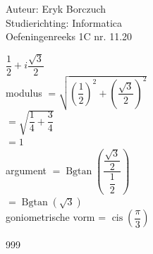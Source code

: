 \documentclass[a4paper]{article}
\begin{document}
  
\noindent \large Auteur: Eryk Borczuch \\
\noindent \large Studierichting: Informatica\\
\noindent \large Oefeningenreeks 1C nr. 11.20\\

\medskip

\normalsize

$\dfrac{1}{2} + i \dfrac{\sqrt{3}}{2}$\\

modulus $= \sqrt{\left(\dfrac{1}{2}\right)^2 + \left(\dfrac{\sqrt{3}}{2}\right)^2}$\\

$= \sqrt{\dfrac{1}{4}+ \dfrac{3}{4}}$\\

$= 1$\\



argument $= \operatorname{Bgtan} \left(\dfrac{\dfrac{\sqrt{3}}{2}}{\dfrac{1}{2}}\right)$\\

$= \operatorname{Bgtan} (\sqrt{3})$\\

goniometrische vorm = $\operatorname{cis}\left(\dfrac{\pi}{3}\right) $\\

\begin{thebibliography}{999}
\end{thebibliography}
\end{document}
